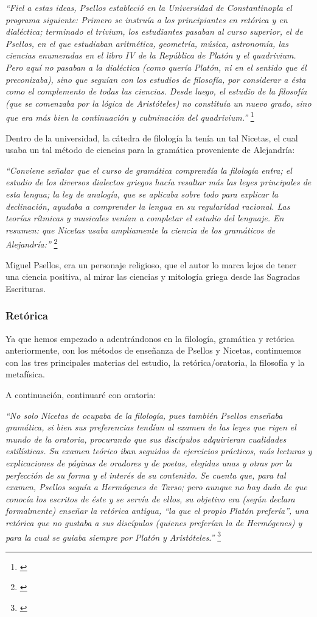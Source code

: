 \textit{“Fiel a estas ideas, Psellos estableció en la Universidad de 
Constantinopla el programa siguiente: Primero se instruía a los 
principiantes en retórica y en dialéctica; terminado el trivium, 
los estudiantes pasaban al curso superior, el de Psellos, en el que 
estudiaban aritmética, geometría, música, astronomía, las ciencias 
enumeradas en el libro IV de la República de Platón y el quadrivium. 
Pero aquí no pasaban a la dialéctica (como quería Platón, ni en el 
sentido que él preconizaba), sino que seguían con los estudios de 
filosofía, por considerar a ésta como el complemento de todas las 
ciencias. Desde luego, el estudio de la filosofía 
(que se comenzaba por la lógica de Aristóteles) no constituía un 
nuevo grado, sino que era más bien la continuación y culminación 
del quadrivium.”}
\footnote{\cite[pp.~161--162]{filosofia}}

Dentro de la universidad, la cátedra de filología la tenía un tal 
Nicetas, el cual usaba un tal método de ciencias para la 
gramática proveniente de Alejandría:

\textit{“Conviene señalar que el curso de gramática comprendía la 
filología entra; el estudio de los diversos dialectos griegos 
hacía resaltar más las leyes principales de esta lengua; la 
ley de analogía, que se aplicaba sobre todo para explicar la 
declinación, ayudaba a comprender la lengua en su regularidad 
racional. Las teorías rítmicas y musicales venían a completar el 
estudio del lenguaje. En resumen: que Nicetas usaba ampliamente la 
ciencia de los gramáticos de Alejandría:”}
\footnote{\cite[p.~162]{filosofia}}

Miguel Psellos, era un personaje religioso, que el autor lo marca 
lejos de tener una ciencia positiva, al mirar las ciencias y 
mitología griega desde las Sagradas Escrituras.


\subsubsection{Retórica}
Ya que hemos empezado a adentrándonos en la filología, gramática y 
retórica anteriormente, con los métodos de enseñanza de Psellos y 
Nicetas, continuemos con las tres principales materias del estudio, 
la retórica/oratoria, la filosofía y la metafísica.

A continuación, continuaré con oratoria:

\textit{“No solo Nicetas de ocupaba de la filología, pues también Psellos 
enseñaba gramática, si bien sus preferencias tendían al examen de 
las leyes que rigen el mundo de la oratoria, procurando que sus discípulos 
adquirieran cualidades estilísticas. Su examen teórico iban seguidos 
de ejercicios prácticos, más lecturas y explicaciones de páginas 
de oradores y de poetas, elegidas unas y otras por la perfección de 
su forma y el interés de su contenido. Se cuenta que, para tal examen, 
Psellos seguía a Hermógenes de Tarso; pero aunque no hay duda de 
que conocía los escritos de éste y se servía de ellos, su objetivo era 
(según declara formalmente) enseñar la retórica antigua, 
“la que el propio Platón prefería”, una retórica que no gustaba a 
sus discípulos (quienes preferían la de Hermógenes) y para la cual 
se guiaba siempre por Platón y Aristóteles.”}
\footnote{\cite[p.~163]{filosofia}}

